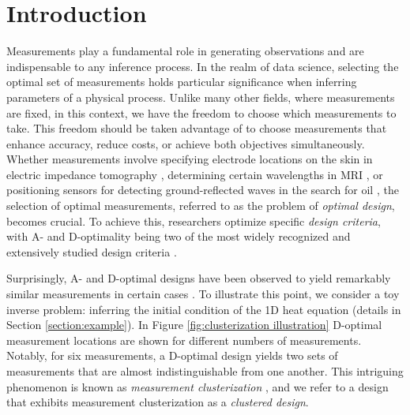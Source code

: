 \section{Introduction}\label{section:intro}
Measurements play a fundamental role in generating observations and
are indispensable to any inference process. In the realm of data
science, selecting the optimal set of measurements holds particular
significance when inferring parameters of a physical process. Unlike
many other fields, where measurements are fixed, in this context, we
have the freedom to choose which measurements to take. This freedom
should be taken advantage of to choose measurements that enhance
accuracy, reduce costs, or achieve both objectives
simultaneously. Whether measurements involve specifying electrode
locations on the skin in electric impedance tomography
\cite{horesh2010impedance}, determining certain wavelengths in MRI
\cite{horesh2008mri}, or positioning sensors for detecting
ground-reflected waves in the search for oil
\cite{horesh2008borehole}, the selection of optimal measurements,
referred to as the problem of \emph{optimal design}, becomes
crucial. To achieve this, researchers optimize specific \emph{design
criteria}, with A- and D-optimality being two of the most widely
recognized and extensively studied design criteria
\cite{Chaloner1995}.


Surprisingly, A- and D-optimal designs have been observed to yield
remarkably similar measurements in certain cases \cite{fedorov1996,
  hooker2009, fedorov2012, Ucinski05, neitzel2019sparse}. To
illustrate this point, we consider a toy inverse problem: inferring
the initial condition of the 1D heat equation (details in Section
\ref{section:example}). In Figure \ref{fig:clusterization
  illustration} D-optimal measurement locations are shown for
different numbers of measurements. Notably, for six measurements, a
D-optimal design yields two sets of measurements that are almost
indistinguishable from one another. This intriguing phenomenon is
known as \emph{measurement clusterization} \cite{Ucinski05}, and we
refer to a design that exhibits measurement clusterization as a
\emph{clustered design}.


